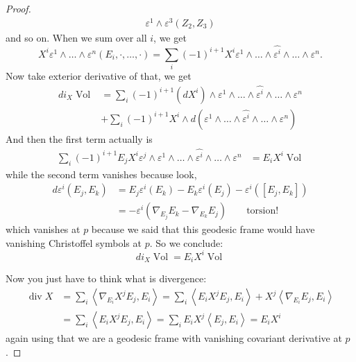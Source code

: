 \documentclass{book}
\begin{document}
\begin{proof}
\begin{align*}
\varepsilon^1\wedge\varepsilon^3(Z_2,Z_3)
\end{align*}
and so on. When we sum over all $i$, we get
$$
X^i\varepsilon^1\wedge\ldots\wedge
\varepsilon^n(E_i,\cdot,\ldots,\cdot)
=\sum_{i}(-1)^{i+1}
X^i\varepsilon^1\wedge\ldots\wedge\widehat{
\varepsilon^i}
\wedge\ldots\wedge\varepsilon^n.
$$
Now take exterior derivative of that, we get
$$
\begin{aligned}
d i_X\operatorname{Vol}
&=\sum_i(-1)^{i+1}(dX^i)
\wedge\varepsilon^1\wedge\ldots
\wedge\widehat{\varepsilon^i}
\wedge\ldots\wedge\varepsilon^n\\
&+\sum_{i}(-1)^{i+1}X^i\wedge
d(\varepsilon^1\wedge\ldots\wedge\widehat{
\varepsilon^i}\wedge\ldots
\wedge\varepsilon^n)\end{aligned}
$$
And then the first term actually is
$$
\begin{aligned}
\sum_i(-1)^{i+1}
E_jX^i\varepsilon^j\wedge\varepsilon^1
\wedge\ldots
\wedge\widehat{\varepsilon^i}
\wedge\ldots\wedge\varepsilon^n
&=E_iX^i\operatorname{Vol}
\end{aligned}
$$
while the second term vanishes because look,
$$
\begin{aligned}d \varepsilon^i(E_j,E_k)
&=E_j\varepsilon^i(E_k)-E_k\varepsilon^i(E_j)
-\varepsilon^i([E_j,E_k])\\
&=-\varepsilon^i(\nabla_{E_j}E_k-\nabla_{E_k}
E_j)\qquad
\text{torsion!}
\end{aligned}
$$
which vanishes at $p$ because we said that
this geodesic frame would have
 vanishing Christoffel symbols at $p$. So we
 conclude:
\[di_X
\operatorname{Vol}=E_iX^i\operatorname{Vol}\]

Now you just have to think what is
divergence:
$$
\begin{aligned}
\operatorname{div}X&=\sum_{i}
\left\langle{}\nabla_{E_i}X^jE_j,E_i\right\rangle{}
=\sum_{i}\left\langle{}E_iX^jE_j,E_i\right\rangle{}+
X^j\left\langle{}\nabla_{E_i}E_j,E_i\right\rangle{}\\
&=\sum_i
\left\langle{}E_iX^jE_j,E_i\right\rangle{}=
\sum_iE_iX^j\left\langle{}E_j,E_i\right\rangle{}=E_iX^i
\end{aligned}
$$
again using that we are a geodesic frame with
vanishing covariant
derivative at $p$.
\end{proof}
\end{document}
